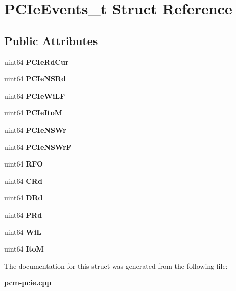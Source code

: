 \section{P\+C\+Ie\+Events\+\_\+t Struct Reference}
\label{structPCIeEvents__t}
\subsection*{Public Attributes}
\begin{DoxyCompactItemize}
\item 
uint64 {\bfseries P\+C\+Ie\+Rd\+Cur}\label{structPCIeEvents__t_a433814915b2f0fb5673db7d42b5c8f01}

\item 
uint64 {\bfseries P\+C\+Ie\+N\+S\+Rd}\label{structPCIeEvents__t_a72c70536a99db58c0ffbee2b0f949cb9}

\item 
uint64 {\bfseries P\+C\+Ie\+Wi\+LF}\label{structPCIeEvents__t_a11255eae6dfabbe8f64f7b5ea818cd8a}

\item 
uint64 {\bfseries P\+C\+Ie\+ItoM}\label{structPCIeEvents__t_a6361b1a7d4ef44d4a9ce98be95ef1f98}

\item 
uint64 {\bfseries P\+C\+Ie\+N\+S\+Wr}\label{structPCIeEvents__t_adc09e10dc946626835a246c2ad23f673}

\item 
uint64 {\bfseries P\+C\+Ie\+N\+S\+WrF}\label{structPCIeEvents__t_afd92992ddfa7437bc37846ce8b26298b}

\item 
uint64 {\bfseries R\+FO}\label{structPCIeEvents__t_a22e3b41c0ce557fdbb8ff95b467ffbeb}

\item 
uint64 {\bfseries C\+Rd}\label{structPCIeEvents__t_a6eb5d5b01e893a54069d20a1e8ab1e00}

\item 
uint64 {\bfseries D\+Rd}\label{structPCIeEvents__t_aacf52abcf1e3417903975e9287b3ab8d}

\item 
uint64 {\bfseries P\+Rd}\label{structPCIeEvents__t_af24f33e0b4ed7b25606d5ef495b70c37}

\item 
uint64 {\bfseries WiL}\label{structPCIeEvents__t_a34ae70c8bf61d8a8d50fd671a3fb62b8}

\item 
uint64 {\bfseries ItoM}\label{structPCIeEvents__t_a09e7e597f7eb1b569e6aefbe02dbf790}

\end{DoxyCompactItemize}


The documentation for this struct was generated from the following file\+:\begin{DoxyCompactItemize}
\item 
{\bf pcm-\/pcie.\+cpp}\end{DoxyCompactItemize}

